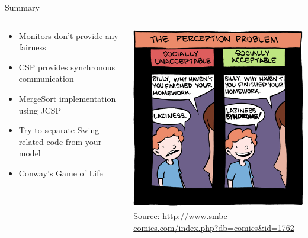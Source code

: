 \begin{frame}{Summary}
  \begin{columns}[c]
    \begin{column}{0.5\textwidth}
      \begin{itemize}
      \item Monitors don't provide any fairness
      \item CSP provides synchronous communication
      \item MergeSort implementation using JCSP
      \item Try to separate Swing related code from your model
      \item Conway's Game of Life
      \end{itemize}
    \end{column}
    \begin{column}{0.5\textwidth}
      \begin{center}
        \includegraphics[width=\textwidth]{figures/homework}\\
        \tiny{Source: \url{http://www.smbc-comics.com/index.php?db=comics&id=1762}}
      \end{center}
    \end{column}
  \end{columns}
\end{frame}


